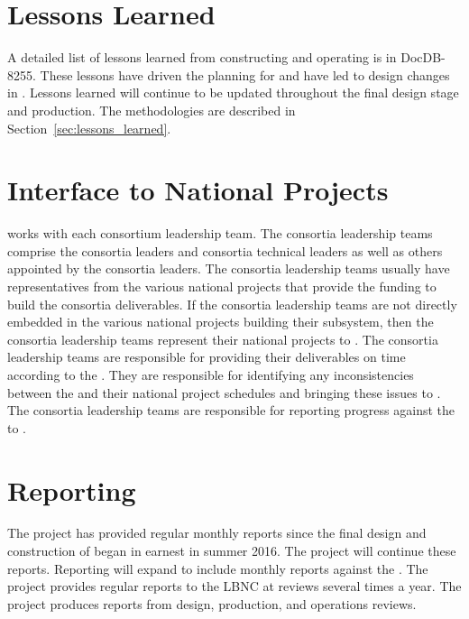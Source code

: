 \section{Lessons Learned}
\label{sec:fdsp-coord-lessons}

A detailed list of lessons learned from constructing and operating
 is in DocDB-8255. These lessons have
driven the planning for  and have led to design changes in
. Lessons learned will continue to be updated throughout the final
design stage and production. The methodologies are described in
Section~\ref{sec:lessons_learned}.

\section{Interface to National Projects}
\label{sec:fdsp-coord-national}

  works with each consortium leadership team. The
consortia leadership teams comprise the consortia leaders and 
consortia technical leaders as well as others appointed by the consortia
leaders. The consortia leadership teams usually have representatives
from the various national projects that provide the funding to build the consortia
deliverables. If the consortia leadership teams are not directly
embedded in the various national projects building their subsystem,
then the consortia leadership teams represent their national projects
to . The consortia leadership teams are responsible for
providing their deliverables on time according to the
. They are responsible for identifying any inconsistencies
between the  and their national project schedules and
bringing these issues to . The consortia leadership teams
are responsible for reporting progress against the  to
.

\section{Reporting}
\label{sec:fdsp-coord-reporting}

The  project has provided regular monthly reports
since the final design and construction of  began in
earnest in summer 2016. The project will continue these reports. Reporting will expand to include monthly reports
against the . The  project provides regular
reports to the LBNC at reviews several times a year. The  project
produces reports from design, production, and operations reviews.

